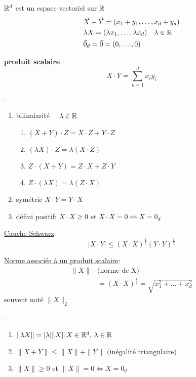 \documentclass[a4paper]{report}
\begin{document}
\begin{definition}
    $\mathbb{R}^d$ est un espace vectoriel sur  $\mathbb{R}$ 
    \begin{align*}
        &\vec{X} + \vec{Y} = (x_1 + y_1, \ldots, x_d + y_d)\\
        &\lambda X = (\lambda x_1, \ldots, \lambda x_d) \quad \lambda \in \mathbb{R}\\
        &\vec{0}_d = \vec{0} = (0, \ldots, 0)
    \end{align*}
\end{definition}
\begin{definition}
    \textbf{produit scalaire}
    \[
    X \cdot Y = \sum_{n=1}^{d} x_iy_i
    \] 
\end{definition}
\begin{prop}
    .
    \begin{enumerate}
        \item bilinaiarité $\quad \lambda \in \mathbb{R}$
            \begin{enumerate}
                \item $(X + Y) \cdot Z = X \cdot Z + Y \cdot Z$
                \item $(\lambda X) \cdot Z = \lambda (X \cdot Z)$
                \item $Z \cdot (X + Y) = Z \cdot X + Z \cdot Y$ 
                \item $Z \cdot (\lambda X) = \lambda (Z \cdot X)$
            \end{enumerate}
        \item symétrie $X \cdot Y = Y \cdot X$
        \item défini positif:  $X \cdot X \ge 0$ et $X \cdot X = 0 \iff X = 0_d$
    \end{enumerate}
\end{prop}
\begin{prop}
    \underline{Cauche-Schwarz}:\\ 
    \[
        |X \cdot Y| \le (X \cdot X)^{\frac{1}{2}}(Y \cdot Y)^{\frac{1}{2}}
    \] 
\end{prop}
\begin{definition}
    \underline{Norme associée à un produit scalaire}:
    \begin{align*}
        \|X\|& \text{(norme de X)}\\
                                  & = (X \cdot X)^{\frac{1}{2}} = \sqrt{x_1^2 + \ldots + x_d^2} 
    \end{align*}
    souvent noté $\|X\|_2$
\end{definition}
\begin{prop}
   . 
   \begin{enumerate}
       \item $\|\lambda X\| = |\lambda|\|X\| \, X \in \mathbb{R}^d, \, \lambda \in \mathbb{R}$
       \item $\|X + Y\| \le \|X\| + \|Y\| \text{ (inégalité triangulaire)}$
       \item $\|X\| \ge 0$ et $\|X\| = 0 \iff X = 0_d$
   \end{enumerate}
\end{prop}
\end{document}
